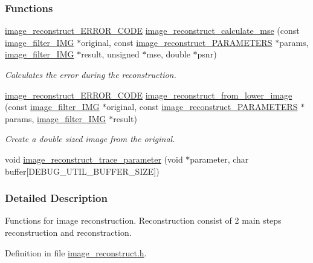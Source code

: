 \subsubsection*{Functions}
\begin{DoxyCompactItemize}
\item 
\hyperlink{a00013_a503a55637040f4b6244d1a6bee6c9f01}{image\-\_\-reconstruct\-\_\-\-E\-R\-R\-O\-R\-\_\-\-C\-O\-D\-E} \hyperlink{a00013_a82d8843b3a27e1edc2bf9ecfa9460341}{image\-\_\-reconstruct\-\_\-calculate\-\_\-mse} (const \hyperlink{a00004}{image\-\_\-filter\-\_\-\-I\-M\-G} $\ast$original, const \hyperlink{a00005}{image\-\_\-reconstruct\-\_\-\-P\-A\-R\-A\-M\-E\-T\-E\-R\-S} $\ast$params, \hyperlink{a00004}{image\-\_\-filter\-\_\-\-I\-M\-G} $\ast$result, unsigned $\ast$mse, double $\ast$psnr)
\begin{DoxyCompactList}\small\item\em Calculates the error during the reconstruction. \end{DoxyCompactList}\item 
\hyperlink{a00013_a503a55637040f4b6244d1a6bee6c9f01}{image\-\_\-reconstruct\-\_\-\-E\-R\-R\-O\-R\-\_\-\-C\-O\-D\-E} \hyperlink{a00013_a12bf63d8952ea0200b447f80e1f0eecd}{image\-\_\-reconstruct\-\_\-from\-\_\-lower\-\_\-image} (const \hyperlink{a00004}{image\-\_\-filter\-\_\-\-I\-M\-G} $\ast$original, const \hyperlink{a00005}{image\-\_\-reconstruct\-\_\-\-P\-A\-R\-A\-M\-E\-T\-E\-R\-S} $\ast$params, \hyperlink{a00004}{image\-\_\-filter\-\_\-\-I\-M\-G} $\ast$result)
\begin{DoxyCompactList}\small\item\em Create a double sized image from the original. \end{DoxyCompactList}\item 
void \hyperlink{a00013_afb80bc758491d33d1398244a6b572d0e}{image\-\_\-reconstruct\-\_\-trace\-\_\-parameter} (void $\ast$parameter, char buffer\mbox{[}D\-E\-B\-U\-G\-\_\-\-U\-T\-I\-L\-\_\-\-B\-U\-F\-F\-E\-R\-\_\-\-S\-I\-Z\-E\mbox{]})
\end{DoxyCompactItemize}


\subsubsection{Detailed Description}
Functions for image reconstruction. Reconstruction consist of 2 main steps reconstruction and reconstraction. 

Definition in file \hyperlink{a00013_source}{image\-\_\-reconstruct.\-h}.



